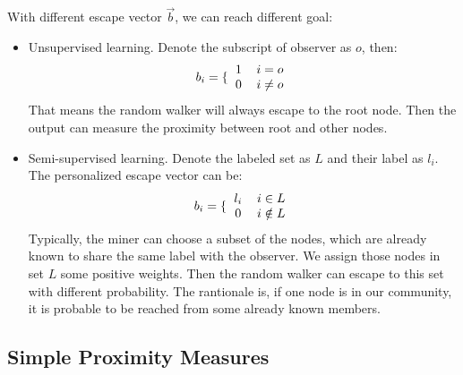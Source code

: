 \documentclass[11pt,a4paper]{article}
\begin{document}
\begin{itemize}
			With different escape vector $\overrightarrow{b}$, we can reach 
			different goal:
				\begin{itemize}
					\item Unsupervised learning. Denote the subscript of observer
					as $o$, then:
					\begin{equation}
						b_i=\lbrace{\begin{tabular}{cc}
							1 & $i=o$ \\
							0 & $i\neq o$ 
						\end{tabular}}
					\end{equation}
					That means the random walker will always escape to the root node. 
					Then the output can measure the proximity between root and other nodes. 
					\item Semi-supervised learning. Denote the labeled set as 
					$L$ and their label as $l_i$. The personalized escape 
					vector can be:
					\begin{equation}
						b_i=\lbrace{\begin{tabular}{cc}
							$l_i$ & $i \in L $ \\
							$0$ & $i\notin L $ 
						\end{tabular}}
					\end{equation}
					Typically, the miner can choose a subset of the nodes, which are
					already known to share the same label with the observer. We assign
					those nodes in set $L$ some positive weights. Then the random walker 
					can escape to this set with different probability. The rantionale is, 
					if one node is in our community, it is probable to be reached 
					from some already known members.  
				\end{itemize}

		\end{itemize}  
		
\subsection{Simple Proximity Measures}
\end{document}
